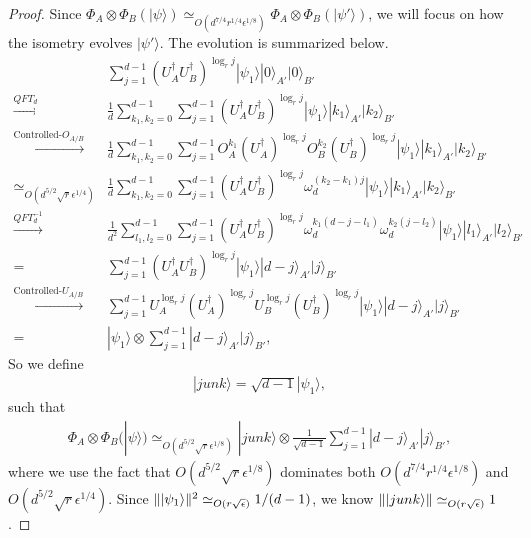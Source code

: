 \documentclass[11pt,letterpaper]{article}
\newcommand{\ket}[1]{|#1\rangle}
\newcommand{\x}{\otimes}
\newcommand{\ct}{^{\dagger}}
\DeclarePairedDelimiter{\norm}{\lVert}{\rVert}
\newcommand{\1}{\mathbb{1}}
\newcommand{\ep}{\epsilon}
\newcommand{\se}{\sqrt{\epsilon}}
\newcommand{\qe}{\epsilon^{1/4}}
\newcommand{\sr}{\sqrt{r}}
\newcommand{\appd}[1]{\simeq_{#1}}
\theoremstyle{definition}
\begin{document}
\begin{proof}
Since $ \Phi_A \x \Phi_B (\ket{\psi}) \appd{O(d^{7/4} r^{1/4} \ep^{1/8})}  \Phi_A \x \Phi_B (\ket{\psi'})$,  
we will focus on how the isometry evolves $\ket{\psi'}$.
The evolution is summarized below.
	\begin{align}
		& \sum_{j=1}^{d-1} (U_A\ct U_B\ct)^{\log_r j} \ket{\psi_1} \ket{0}_{A'}\ket{0}_{B'}\\
		\xrightarrow[]{QFT_d}& \frac{1}{d}\sum_{k_1,k_2 = 0}^{d-1} \sum_{j=1}^{d-1} (U_A\ct U_B\ct)^{\log_r j}  \ket{\psi_1}\ket{k_1}_{A'}\ket{k_2}_{B'}\\
		\xrightarrow[]{\text{Controlled-}O_{A/B}}& \frac{1}{d}\sum_{k_1,k_2 = 0}^{d-1} \sum_{j=1}^{d-1} O_A^{k_1}(U_A\ct)^{\log_r j} O_B^{k_2}(U_B\ct)^{\log_r j}
		\ket{\psi_1} \ket{k_1}_{A'}\ket{k_2}_{B'}\\
		\appd{O(d^{5/2} \sr \qe)}&\frac{1}{d} \sum_{k_1,k_2 = 0}^{d-1} \sum_{j=1}^{d-1} (U_A\ct U_B\ct)^{\log_r j}\omega_d^{(k_2-k_1)j}\ket{\psi_1} \ket{k_1}_{A'}\ket{k_2}_{B'}\\
		\xrightarrow[]{QFT_d^{-1}} &\frac{1}{d^2}\sum_{l_1,l_2 = 0}^{d-1}\sum_{j=1}^{d-1} (U_A\ct U_B\ct)^{\log_r j} 
		\omega_d^{k_1(d-j-l_1)}\omega_d^{k_2(j-l_2)}\ket{\psi_1} \ket{l_1}_{A'}\ket{l_2}_{B'}\\
		= &\sum_{j=1}^{d-1}(U_A\ct U_B\ct)^{\log_r j} \ket{\psi_1} \ket{d-j}_{A'}\ket{j}_{B'} \\
		\xrightarrow[]{\text{Controlled-}U_{A/B}}& \sum_{j=1}^{d-1} U_A^{\log_r j} (U_A\ct)^{\log_r j} U_B^{\log_r j} (U_B\ct)^{\log_r j} \ket{\psi_1} \ket{d-j}_{A'}\ket{j}_{B'}\\
		=&\ket{\psi_1} \x \sum_{j=1}^{d-1} \ket{d-j}_{A'}\ket{j}_{B'},
	\end{align}
So we define 
\begin{align}
	\ket{junk} = \sqrt{d-1}\ket{\psi_1},
\end{align}
such that 
\begin{align}
	\Phi_A\x\Phi_B(\ket{\psi}) \appd{O(d^{5/2} \sr \ep^{1/8})} \ket{junk} \x \frac{1}{\sqrt{d-1}}\sum_{j=1}^{d-1} \ket{d-j}_{A'}\ket{j}_{B'},
\end{align}
where we use the fact that $O(d^{5/2} \sr \ep^{1/8})$ dominates both $O(d^{7/4} r^{1/4} \ep^{1/8})$ and 
$O(d^{5/2} \sr \qe)$.
Since $\norm{\ket{\psi_1}}^2 \appd{O(r \se)} 1/(d-1)$, we know $\norm{\ket{junk}} \appd{O(r\se)} 1$.
	

\end{proof}
\end{document}
